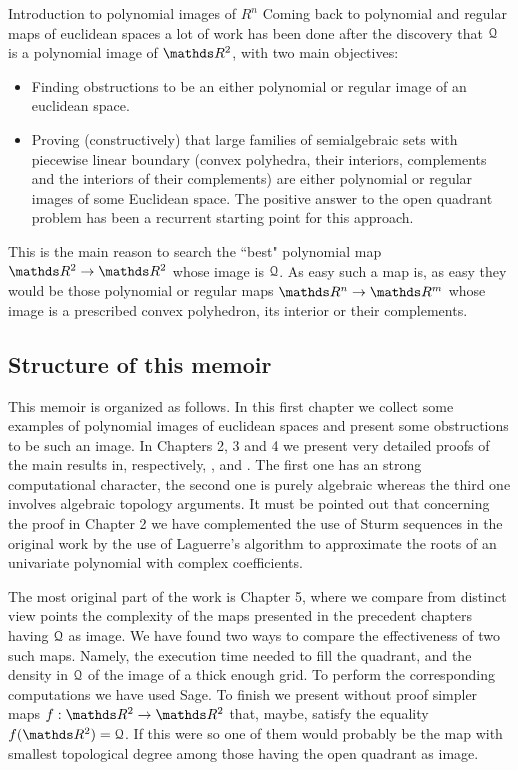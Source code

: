 \documentclass[11pt, a4paper, english, twoside, notitlepage, openright]{report}
\begin{document}
\begin{chapter}{Introduction to polynomial images of $R^n$}
Coming back to polynomial and regular maps of euclidean spaces a lot of work has been done after the discovery that $\mathcal{Q}$ is a polynomial image of $\R^2$, with two main objectives: 
\begin{itemize}
\item Finding obstructions to be an either polynomial or regular image of an euclidean space. 
\item Proving (constructively) that large families of semialgebraic sets with piecewise linear boundary (convex polyhedra, their interiors, complements and the interiors of their complements) are either polynomial or regular images of some Euclidean space. The positive answer to the open quadrant problem has been a recurrent starting point for this approach.
\end{itemize}
This is the main reason to search the ``best" polynomial map $\R^2\to\R^2$ whose image is $\mathcal{Q}$. As easy such a map is, as easy they would be those polynomial or regular maps $\R^n\to\R^m$ whose image is a prescribed convex polyhedron, its interior or their complements. 

\subsection{Structure of this memoir}
This memoir is organized as follows. In this first chapter we collect some examples of polynomial images of euclidean spaces and present some obstructions to be such an image. In Chapters 2, 3 and 4 we present very detailed proofs of the main results in, respectively, \cite{fg}, \cite{fu} and \cite{fgu}. The first one has an strong computational character, the second one is purely algebraic whereas the third one involves algebraic topology arguments. It must be pointed out that concerning the proof in Chapter 2 we have complemented the use of Sturm sequences in the original work \cite{fg} by the use of Laguerre's algorithm to approximate the roots of an univariate polynomial with complex coefficients.

The most original part of the work is Chapter 5, where we compare from distinct view points the complexity of the maps presented in the precedent chapters having $\mathcal{Q}$ as image. We have found two ways to compare the effectiveness of two such maps. Namely, the execution time needed to fill the quadrant, and the density in $\mathcal{Q}$ of the image of a thick enough grid. To perform the corresponding computations we have used Sage. To finish we present without proof simpler maps $f:\R^2\to\R^2$ that, maybe, satisfy the equality $f(\R^2)=\Qu$. If this were so one of them would probably be the map with smallest topological degree among those having the open quadrant as image.


\end{chapter}
\end{document}
